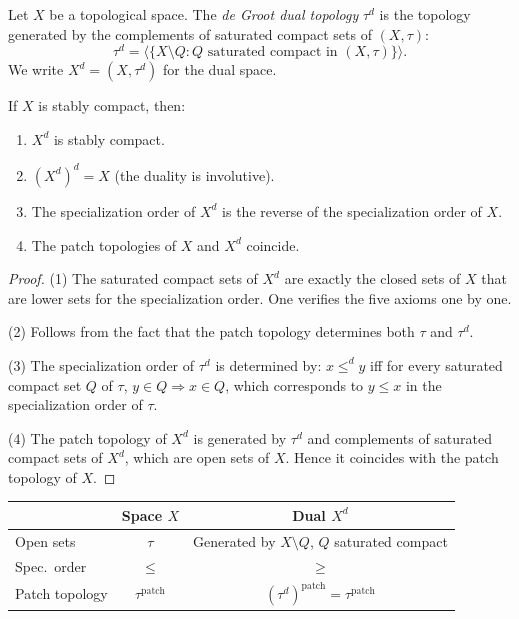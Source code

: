 \begin{definition}
Let $X$ be a topological space. The \emph{de Groot dual topology} $\tau^d$ is the topology
generated by the complements of saturated compact sets of $(X,\tau)$:
\[
  \tau^d = \langle \{ X \setminus Q : Q \text{ saturated compact in } (X,\tau) \} \rangle.
\]
We write $X^d = (X, \tau^d)$ for the dual space.
\end{definition}

\begin{theorem}
\label{thm:de-groot}
If $X$ is stably compact, then:
\begin{enumerate}
  \item $X^d$ is stably compact.
  \item $(X^d)^d = X$ (the duality is involutive).
  \item The specialization order of $X^d$ is the reverse of the specialization order of $X$.
  \item The patch topologies of $X$ and $X^d$ coincide.
\end{enumerate}
\end{theorem}

\begin{proof}
(1) The saturated compact sets of $X^d$ are exactly the closed sets of $X$ that are lower
sets for the specialization order. One verifies the five axioms one by one.

(2) Follows from the fact that the patch topology determines both $\tau$ and $\tau^d$.

(3) The specialization order of $\tau^d$ is determined by: $x \leq^d y$ iff for every
saturated compact set $Q$ of $\tau$, $y \in Q \Rightarrow x \in Q$, which corresponds to
$y \leq x$ in the specialization order of $\tau$.

(4) The patch topology of $X^d$ is generated by $\tau^d$ and complements of saturated
compact sets of $X^d$, which are open sets of $X$. Hence it coincides with the patch
topology of $X$.
\end{proof}

\begin{keyformulas}[title=\textbf{Summary: de Groot duality}]
\begin{center}
\renewcommand{\arraystretch}{1.3}
\begin{tabular}{|l|c|c|}
\hline
& \textbf{Space} $X$ & \textbf{Dual} $X^d$ \\
\hline
Open sets & $\tau$ & Generated by $X \setminus Q$, $Q$ saturated compact \\
Spec.\ order & $\leq$ & $\geq$ \\
Patch topology & $\tau^{\mathrm{patch}}$ & $(\tau^d)^{\mathrm{patch}} = \tau^{\mathrm{patch}}$ \\
\hline
\end{tabular}
\end{center}
\end{keyformulas}

